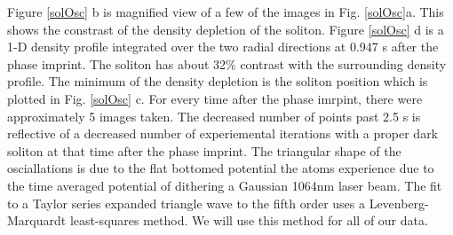 \documentclass{nature}
\begin{document}
Figure \ref{solOsc} b is magnified view of a few of the images in Fig. \ref{solOsc}a. This shows the constrast of the density depletion of the soliton. Figure \ref{solOsc} d is a 1-D density profile integrated over the two radial directions at 0.947 s after the phase imprint. The soliton has about 32\% contrast with the surrounding density profile. The minimum of the density depletion is the soliton position which is plotted in Fig. \ref{solOsc} c. For every time after the phase imrpint, there were approximately 5 images taken. The decreased number of points past 2.5 s is reflective of a decreased number of experiemental iterations with a proper dark soliton at that time after the phase imprint. The triangular shape of the osciallations is due to the flat bottomed potential the atoms experience due to the time averaged potential of dithering a Gaussian 1064nm laser beam. The fit to a Taylor series expanded triangle wave to the fifth order uses a Levenberg-Marquardt least-squares method. We will use this method for all of our data. 
\end{document}
